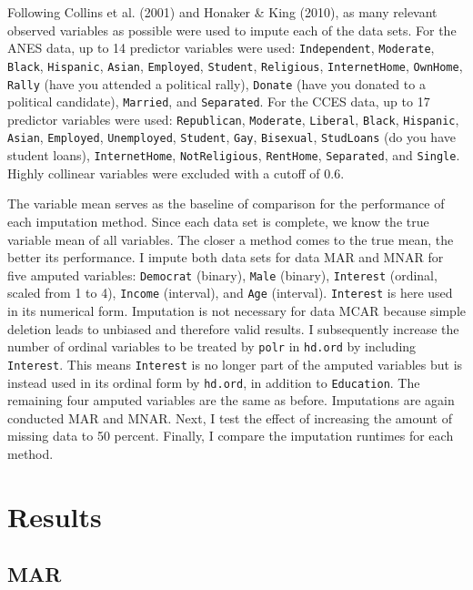 \documentclass[12pt,econ]{sources/authesis}
\begin{document}
Following Collins et al. (2001) and Honaker \& King (2010), as many relevant observed variables as possible were used to impute each of the data sets. For the ANES data, up to 14 predictor variables were used: \texttt{Independent}, \texttt{Moderate}, \texttt{Black}, \texttt{Hispanic}, \texttt{Asian}, \texttt{Employed}, \texttt{Student}, \texttt{Religious}, \texttt{InternetHome}, \texttt{OwnHome}, \texttt{Rally} (have you attended a political rally), \texttt{Donate} (have you donated to a political candidate), \texttt{Married}, and \texttt{Separated}. For the CCES data, up to 17 predictor variables were used: \texttt{Republican}, \texttt{Moderate}, \texttt{Liberal}, \texttt{Black}, \texttt{Hispanic}, \texttt{Asian}, \texttt{Employed}, \texttt{Unemployed}, \texttt{Student}, \texttt{Gay}, \texttt{Bisexual}, \texttt{StudLoans} (do you have student loans), \texttt{InternetHome}, \texttt{NotReligious}, \texttt{RentHome}, \texttt{Separated}, and \texttt{Single}. Highly collinear variables were excluded with a cutoff of 0.6.

The variable mean serves as the baseline of comparison for the performance of each imputation method. Since each data set is complete, we know the true variable mean of all variables. The closer a method comes to the true mean, the better its performance. I impute both data sets for data MAR and MNAR for five amputed variables: \texttt{Democrat} (binary), \texttt{Male} (binary), \texttt{Interest} (ordinal, scaled from 1 to 4), \texttt{Income} (interval), and \texttt{Age} (interval). \texttt{Interest} is here used in its numerical form. Imputation is not necessary for data MCAR because simple deletion leads to unbiased and therefore valid results. I subsequently increase the number of ordinal variables to be treated by \texttt{polr} in \texttt{hd.ord} by including \texttt{Interest}. This means \texttt{Interest} is no longer part of the amputed variables but is instead used in its ordinal form by \texttt{hd.ord}, in addition to \texttt{Education}. The remaining four amputed variables are the same as before. Imputations are again conducted MAR and MNAR. Next, I test the effect of increasing the amount of missing data to 50 percent. Finally, I compare the imputation runtimes for each method.

\hypertarget{ordmiss-results}{%
\section{Results}\label{ordmiss-results}}

\hypertarget{ordmiss-results-mar}{%
\subsection{MAR}\label{ordmiss-results-mar}}
\end{document}
